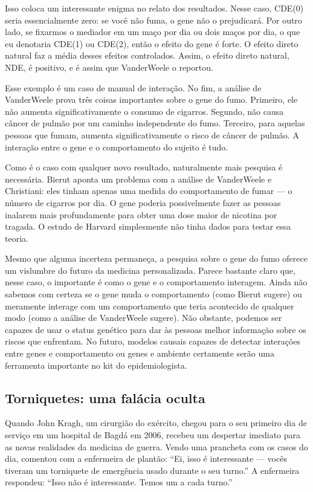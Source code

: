\documentclass[11pt,a5paper,twoside]{book}
\begin{document}
Isso coloca um interessante enigma no relato dos resultados. Nesse caso, CDE(0) seria essencialmente zero: se você não fuma, o gene não o prejudicará. Por outro lado, se fixarmos o mediador em um maço por dia ou dois maços por dia, o que eu denotaria CDE(1) ou CDE(2), então o efeito do gene é forte. O efeito direto natural faz a média desses efeitos controlados. Assim, o efeito direto natural, NDE, é positivo, e é assim que VanderWeele o reportou.

Esse exemplo é um caso de manual de interação. No fim, a análise de VanderWeele prova três coisas importantes sobre o gene do fumo. Primeiro, ele não aumenta significativamente o consumo de cigarros. Segundo, não causa câncer de pulmão por um caminho independente do fumo. Terceiro, para aquelas pessoas que fumam, aumenta significativamente o risco de câncer de pulmão. A interação entre o gene e o comportamento do sujeito é tudo.

Como é o caso com qualquer novo resultado, naturalmente mais pesquisa é necessária. Bierut aponta um problema com a análise de VanderWeele e Christiani: eles tinham apenas uma medida do comportamento de fumar — o número de cigarros por dia. O gene poderia possivelmente fazer as pessoas inalarem mais profundamente para obter uma dose maior de nicotina por tragada. O estudo de Harvard simplesmente não tinha dados para testar essa teoria.

Mesmo que alguma incerteza permaneça, a pesquisa sobre o gene do fumo oferece um vislumbre do futuro da medicina personalizada. Parece bastante claro que, nesse caso, o importante é como o gene e o comportamento interagem. Ainda não sabemos com certeza se o gene muda o comportamento (como Bierut sugere) ou meramente interage com um comportamento que teria acontecido de qualquer modo (como a análise de VanderWeele sugere). Não obstante, podemos ser capazes de usar o status genético para dar às pessoas melhor informação sobre os riscos que enfrentam. No futuro, modelos causais capazes de detectar interações entre genes e comportamento ou genes e ambiente certamente serão uma ferramenta importante no kit do epidemiologista.

\subsection{Torniquetes: uma falácia oculta}
Quando John Kragh, um cirurgião do exército, chegou para o seu primeiro dia de serviço em um hospital de Bagdá em 2006, recebeu um despertar imediato para as novas realidades da medicina de guerra. Vendo uma prancheta com os casos do dia, comentou com a enfermeira de plantão: “Ei, isso é interessante — vocês tiveram um torniquete de emergência usado durante o seu turno.” A enfermeira respondeu: “Isso não é interessante. Temos um a cada turno.”
\end{document}
